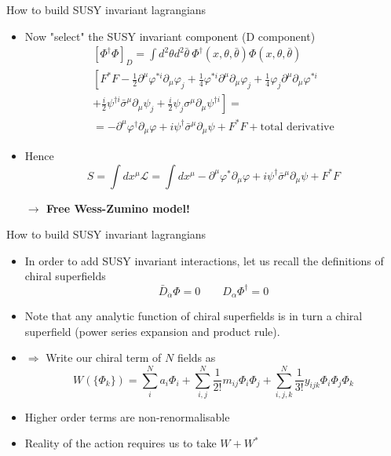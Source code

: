 \documentclass[10pt]{beamer}
\begin{document}
\begin{frame}{How to build SUSY invariant lagrangians}
    \begin{itemize}
        \item Now "select" the SUSY invariant component (D component)
        \begin{gather*}
            \left[\Phi^{\dagger}\Phi\right]_D = \int d^2\theta d^2\bar\theta \ \Phi^{\dagger}(x, \theta, \bar\theta) \Phi(x, \theta, \bar\theta) \\
            \left[F^{*} F - \frac{1}{2} \partial^{\mu} \varphi^{* i} \partial_{\mu} \varphi_{j}+\frac{1}{4} \varphi^{* i} \partial^{\mu} \partial_{\mu} \varphi_{j}+\frac{1}{4} \varphi_{j} \partial^{\mu} \partial_{\mu} \varphi^{* i}\right. \\
                    \left.+\frac{i}{2} \psi^{\dagger i} \bar{\sigma}^{\mu} \partial_{\mu} \psi_{j}+\frac{i}{2} \psi_{j} \sigma^{\mu} \partial_{\mu} \psi^{\dagger i}\right] = \\
            = -\partial^{\mu}\varphi^{\dagger}\partial_{\mu}\varphi + i\psi^{\dagger}\bar\sigma^{\mu}\partial_{\mu}\psi + F^{*}F + \text{total derivative}
        \end{gather*}
        \item Hence 
        \begin{equation*}
            \boxed{S = \int dx^{\mu} \mathcal{L} = \int dx^{\mu} -\partial^{\mu}\varphi^{*}\partial_{\mu}\varphi + i\psi^{\dagger}\bar\sigma^{\mu}\partial_{\mu}\psi + F^{*}F}
        \end{equation*}
        \centerline{\bfseries $\rightarrow$ Free Wess-Zumino model!}
    \end{itemize}
\end{frame}

\begin{frame}{How to build SUSY invariant lagrangians}
    \begin{itemize}
        \item In order to add SUSY invariant interactions, let us recall the definitions of chiral superfields 
            \begin{equation*}
                \bar D_{\dot\alpha} \Phi = 0 \qquad D_{\alpha} \Phi^{\dagger} = 0
            \end{equation*}
        \item Note that any analytic function of chiral superfields is in turn a chiral superfield (power series expansion and product rule). \\
        \item $\Rightarrow$ Write our chiral term of $N$ fields as 
            \begin{equation*}
                W(\{\Phi_k\}) = \sum_i^N a_i \Phi_i + \sum_{i,j}^N \frac{1}{2!} m_{ij} \Phi_{i}\Phi_j + \sum_{i,j,k}^N \frac{1}{3!} y_{ijk} \Phi_i \Phi_j \Phi_k
            \end{equation*}
        \item Higher order terms are non-renormalisable \\
        \item Reality of the action requires us to take $W + W^*$
    \end{itemize}
\end{frame}
\end{document}
